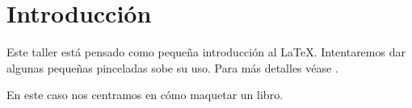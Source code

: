 

\chapter*{Introducción}

Este taller está pensado como pequeña introducción al \LaTeX. Intentaremos dar algunas pequeñas pinceladas sobe su uso. Para m\'as detalles véase \cite{lshort}.

En este caso nos centramos en cómo maquetar un libro.